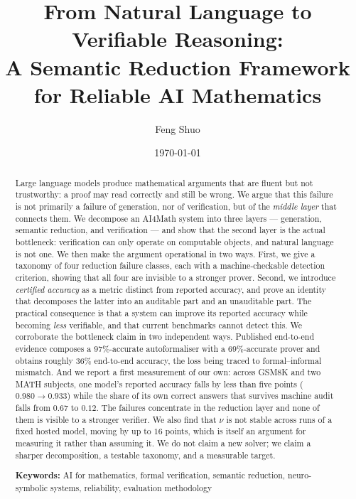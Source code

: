 \documentclass[11pt,a4paper]{article}
\title{From Natural Language to Verifiable Reasoning:\\
A Semantic Reduction Framework for Reliable AI Mathematics}
\author{Feng Shuo}
\date{\today}
\begin{document}
\maketitle

\begin{abstract}
Large language models produce mathematical arguments that are fluent but not
trustworthy: a proof may read correctly and still be wrong.  We argue that this
failure is not primarily a failure of generation, nor of verification, but of
the \emph{middle layer} that connects them.  We decompose an AI4Math system into
three layers --- generation, semantic reduction, and verification --- and show
that the second layer is the actual bottleneck: verification can only operate on
computable objects, and natural language is not one.  We then make the argument
operational in two ways.  First, we give a taxonomy of four reduction failure
classes, each with a machine-checkable detection criterion, showing that all
four are invisible to a stronger prover.  Second, we introduce
\emph{certified accuracy} as a metric distinct from reported accuracy, and prove
an identity that decomposes the latter into an auditable part and an unauditable
part.  The practical consequence is that a system can improve its reported
accuracy while becoming \emph{less} verifiable, and that current benchmarks
cannot detect this.  We corroborate the bottleneck claim in two independent ways.  Published
end-to-end evidence composes a $97\%$-accurate autoformaliser with a
$69\%$-accurate prover and obtains roughly $36\%$ end-to-end accuracy, the loss
being traced to formal--informal mismatch.  And we report a first measurement of
our own: across GSM8K and two MATH subjects, one model's reported accuracy falls
by less than five points ($0.980 \to 0.933$) while the share of its own correct
answers that survives machine audit falls from $0.67$ to $0.12$.  The failures
concentrate in the reduction layer and none of them is visible to a stronger
verifier.  We also find that $\nu$ is not stable across runs of a fixed hosted
model, moving by up to $16$ points, which is itself an argument for measuring it
rather than assuming it.  We do not claim a new solver; we claim a sharper
decomposition, a testable taxonomy, and a measurable target.

\noindent\textbf{Keywords:} AI for mathematics, formal verification, semantic
reduction, neuro-symbolic systems, reliability, evaluation methodology
\end{abstract}
\end{document}
